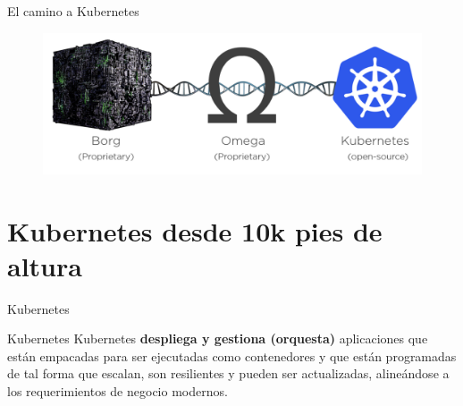 \documentclass[aspectratio=169]{beamer}
\begin{document}
\begin{frame}{El camino a Kubernetes}
    \begin{figure}
        \centering
        \includegraphics[width=\linewidth]{Images/borg.png}
    \end{figure}

\end{frame}




{
    \section{Kubernetes desde 10k pies de altura}
}


\begin{frame}{Kubernetes}

    \begin{exampleblock}{Kubernetes}
Kubernetes \textbf{despliega y gestiona (orquesta)} aplicaciones que están empacadas para ser ejecutadas como contenedores y que están programadas de tal forma que escalan, son resilientes y pueden ser actualizadas, alineándose a los requerimientos de negocio modernos.
    \end{exampleblock}

\end{frame}
\end{document}
